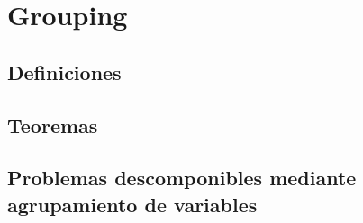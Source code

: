 
\chapter{Grouping}

\section{Definiciones}

\section{Teoremas}

\section{Problemas descomponibles mediante agrupamiento de variables}


\endinput

